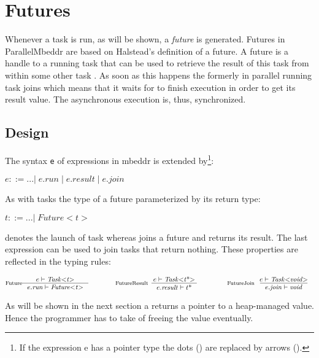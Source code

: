 \section{Futures}
Whenever a task  is run, as will be shown, a \textit{future} is generated. Futures in ParallelMbeddr are based on Halstead's definition of a future\cite{Halstead_Multilisp}. A future is a handle to a running task that can be used to retrieve the result of this task from within some other task . As soon as this happens the formerly in parallel running task  joins  which means that it waits for  to finish execution in order to get its result value. The asynchronous execution is, thus, synchronized.

\subsection{Design}
The syntax \texttt{e} of expressions in mbeddr is extended by\footnote{If the expression e has a pointer type the dots () are replaced by arrows (\CODE{->}).}:

$ e ::= ...|\;e.\mathit{run}\;|\;e.\mathit{result}\;|\;e.\mathit{join} $

As with tasks the type of a future parameterized by its return type:

$ t ::= ...|\;\mathit{Future{<}t{>}}$

 denotes the launch of task  whereas  joins a future  and returns its result. The last expression  can be used to join tasks that return nothing. %
These properties are reflected in the typing rules:

\begin{center}
\begin{align*}
\inference*[Future]{e |- \mathit{Task{<}t{>}}}{e.\mathit{run} |- \mathit{Future{<}t{>}}}
\qquad\qquad
\inference*[FutureResult]{e |- \mathit{Task{<}t\text{*}{>}}}{e.\mathit{result} |- t\text{*}}
\qquad\qquad
\inference*[FutureJoin]{e |- \mathit{Task{<}void{>}}}{e.\mathit{join} |- \mathit{void}}
\end{align*}
\end{center}

As will be shown in the next section a 
 returns a pointer to a heap-managed value. Hence the programmer has to take of freeing the value eventually.

